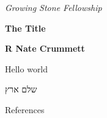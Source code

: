\documentclass[dark]{gsf-presentation}
\begin{document}
\begin{frame}[plain]
	\begin{center}
		\textit{\Large Growing Stone Fellowship}

		\vspace{3mm}
		\textbf{\huge The Title}

		\vspace{5mm}
		\textcolor{SecondColor}{\bf \Large R Nate Crummett}
	\end{center}
\end{frame}

\begin{frame}
	\LARGE
	\begin{english}
		\begin{center}
			Hello world
		\end{center}
	\end{english}

	\begin{hebrew}
		\begin{center}
			שלם ארץ
		\end{center}
	\end{hebrew}
\end{frame}

\begin{frame}{References}
	\printbibliography
\end{frame}
\end{document}
